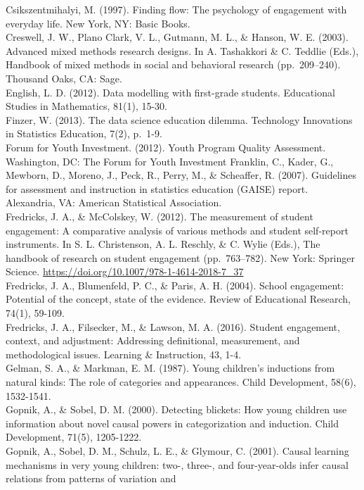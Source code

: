 \documentclass[]{msu-thesis}
\theoremstyle{definition}
\theoremstyle{definition}
\theoremstyle{definition}
\theoremstyle{remark}
\begin{document}
Csikszentmihalyi, M. (1997). Finding flow: The psychology of engagement
with everyday life. New York, NY: Basic Books.\\
Creswell, J. W., Plano Clark, V. L., Gutmann, M. L., \& Hanson, W. E.
(2003). Advanced mixed methods research designs. In A. Tashakkori \& C.
Teddlie (Eds.), Handbook of mixed methods in social and behavioral
research (pp.~209--240). Thousand Oaks, CA: Sage.\\
English, L. D. (2012). Data modelling with first-grade students.
Educational Studies in Mathematics, 81(1), 15-30.\\
Finzer, W. (2013). The data science education dilemma. Technology
Innovations in Statistics Education, 7(2), p.~1-9.\\
Forum for Youth Investment. (2012). Youth Program Quality Assessment.
Washington, DC: The Forum for Youth Investment Franklin, C., Kader, G.,
Mewborn, D., Moreno, J., Peck, R., Perry, M., \& Scheaffer, R. (2007).
Guidelines for assessment and instruction in statistics education
(GAISE) report. Alexandria, VA: American Statistical Association.\\
Fredricks, J. A., \& McColskey, W. (2012). The measurement of student
engagement: A comparative analysis of various methods and student
self-report instruments. In S. L. Christenson, A. L. Reschly, \& C.
Wylie (Eds.), The handbook of research on student engagement
(pp.~763--782). New York: Springer Science.
\url{https://doi.org/10.1007/978-1-4614-2018-7_37}\\
Fredricks, J. A., Blumenfeld, P. C., \& Paris, A. H. (2004). School
engagement: Potential of the concept, state of the evidence. Review of
Educational Research, 74(1), 59-109.\\
Fredricks, J. A., Filsecker, M., \& Lawson, M. A. (2016). Student
engagement, context, and adjustment: Addressing definitional,
measurement, and methodological issues. Learning \& Instruction, 43,
1-4.\\
Gelman, S. A., \& Markman, E. M. (1987). Young children's inductions
from natural kinds: The role of categories and appearances. Child
Development, 58(6), 1532-1541.\\
Gopnik, A., \& Sobel, D. M. (2000). Detecting blickets: How young
children use information about novel causal powers in categorization and
induction. Child Development, 71(5), 1205-1222.\\
Gopnik, A., Sobel, D. M., Schulz, L. E., \& Glymour, C. (2001). Causal
learning mechanisms in very young children: two-, three-, and
four-year-olds infer causal relations from patterns of variation and
\end{document}
